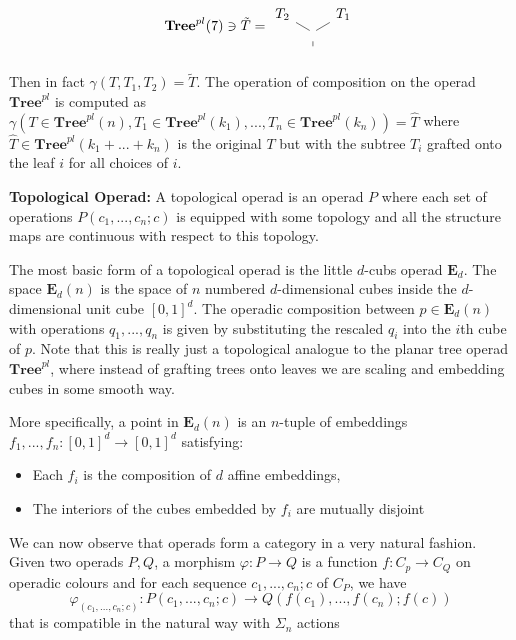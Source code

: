 \[\mathbf{Tree}^{pl}(7) \ni \tilde{T} = 
\begin{tikzcd}[column sep=0.8em, row sep=0.4em]
T_2\arrow[dr, dash] & & T_1\arrow[dl, dash] \\
& \arrow[d, dash] & \\
& {} &
\end{tikzcd}
\]

Then in fact $\gamma(T, T_1, T_2) = \tilde{T}$. The operation of composition on the operad $\mathbf{Tree}^{pl}$ is computed as $\gamma(T\in\mathbf{Tree}^{pl}(n), T_1 \in \mathbf{Tree}^{pl}(k_1), ..., T_n\in\mathbf{Tree}^{pl}(k_n)) = \hat{T}$ where $\hat{T}\in \mathbf{Tree}^{pl}(k_1 + ... + k_n)$ is the original $T$ but with the subtree $T_i$ grafted onto the leaf $i$ for all choices of $i$.

\begin{definition}
    \textbf{Topological Operad: }A topological operad is an operad $P$ where each set of operations $P(c_1,...,c_n;c)$ is equipped with some topology and all the structure maps are continuous with respect to this topology.
\end{definition}

The most basic form of a topological operad is the little $d$-cubs operad $\mathbf{E}_d$. The space $\mathbf{E}_d(n)$ is the space of $n$ numbered $d$-dimensional cubes inside the $d$-dimensional unit cube $[0,1]^d$. The operadic composition between $p \in \mathbf{E}_d(n)$ with operations $q_1,...,q_n$ is given by substituting the rescaled $q_i$ into the $i$th cube of $p$. Note that this is really just a topological analogue to the planar tree operad $\mathbf{Tree}^{pl}$, where instead of grafting trees onto leaves we are scaling and embedding cubes in some smooth way. 

More specifically, a point in $\mathbf{E}_d(n)$ is an $n$-tuple of embeddings $f_1,...,f_n: [0,1]^d\to [0,1]^d$ satisfying:
\begin{itemize}
    \item Each $f_i$ is the composition of $d$ affine embeddings,
    \item The interiors of the cubes embedded by $f_i$ are mutually disjoint
\end{itemize}

We can now observe that operads form a category in a very natural fashion. Given two operads $P,Q$, a morphism $\varphi: P\to Q$ is a function $f: C_p\to C_Q$ on operadic colours and for each sequence $c_1,...,c_n;c$ of $C_P$, we have 
\[\varphi_{(c_1,...,c_n;c)}:P(c_1,...,c_n;c) \to Q(f(c_1),...,f(c_n);f(c))\]
that is compatible in the natural way with $\Sigma_n$ actions

